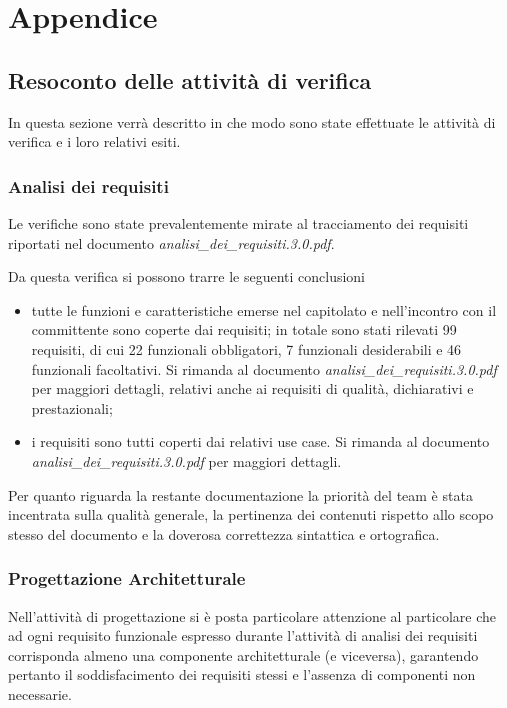 \clearpage

\section{Appendice}

\subsection{Resoconto delle attività di verifica}
In questa sezione verrà descritto in che modo sono state effettuate le attività di verifica e i loro relativi esiti.

\subsubsection{Analisi dei requisiti}
Le verifiche sono state prevalentemente mirate al tracciamento dei requisiti riportati nel documento \textit{analisi\_dei\_requisiti.3.0.pdf}.

Da questa verifica si possono trarre le seguenti conclusioni
\begin{itemize}
\item tutte le funzioni e caratteristiche emerse nel capitolato e nell'incontro con il committente sono coperte dai requisiti;
in totale sono stati rilevati 99 requisiti, di cui 22 funzionali obbligatori, 7 funzionali desiderabili e 46 funzionali facoltativi. Si rimanda al documento \textit{analisi\_dei\_requisiti.3.0.pdf} per maggiori dettagli, relativi anche ai requisiti di qualità, dichiarativi e prestazionali;

\item i requisiti sono tutti coperti dai relativi use case. Si rimanda al documento \textit{analisi\_dei\_requisiti.3.0.pdf} per maggiori dettagli.
\end{itemize}

Per quanto riguarda la restante documentazione la priorità del team è stata incentrata sulla qualità generale, la pertinenza dei contenuti rispetto allo scopo stesso del documento e la doverosa correttezza sintattica e ortografica.

\subsubsection {Progettazione Architetturale}
Nell'attività di progettazione si è posta particolare attenzione al particolare che ad ogni requisito funzionale espresso durante l'attività di analisi dei requisiti corrisponda almeno una componente architetturale (e viceversa), garantendo pertanto il soddisfacimento dei requisiti stessi e l'assenza di componenti non necessarie.

